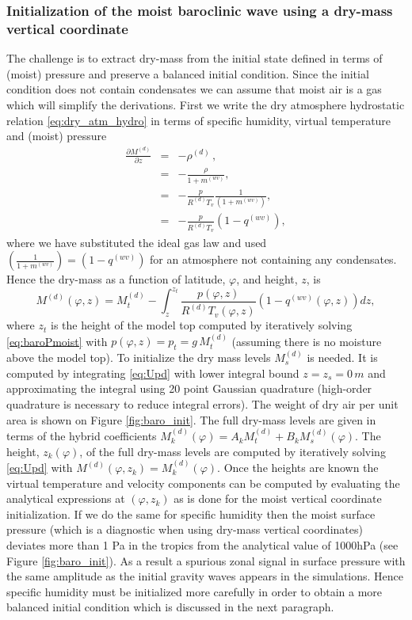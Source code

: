 \documentclass{agujournal}
\begin{document}
\subsubsection{Initialization of the moist baroclinic wave using a dry-mass vertical coordinate}
The challenge is to extract dry-mass from the initial state defined in terms of (moist) pressure and preserve a balanced initial condition. Since the initial condition does not contain condensates we can assume that moist air is a gas which will simplify the derivations. First we write the dry atmosphere hydrostatic relation \eqref{eq:dry_atm_hydro} in terms of specific humidity, virtual temperature and (moist) pressure
\begin{eqnarray}
\frac{\partial M^{(d)}}{\partial z}&=&-\rho^{(d)}\, ,\\
&=&-\frac{\rho}{1+m^{(wv)}},\\
&=&-\frac{p}{R^{(d)}T_v}\frac{1}{\left( 1+m^{(wv)}\right)},\\
&=&-\frac{p}{R^{(d)}T_v}\left(1-q^{(wv)}\right),
\end{eqnarray}
where we have substituted the ideal gas law and used $\left( \frac{1}{1+m^{(wv)}} \right)=\left( 1-q^{(wv)} \right)$ for an atmosphere not containing any condensates. Hence the dry-mass as a function of latitude, $\varphi$, and height, $z$, is
\begin{equation}
{M}^{(d)}(\varphi,z)=M^{(d)}_t-\int_z^{z_t}\frac{p(\varphi,z)}{R^{(d)} T_v(\varphi,z)}\left(1-q^{(wv)}(\varphi,z)\right) dz,\label{eq:Upd}
\end{equation}
where $z_t$ is the height of the model top computed by iteratively solving \eqref{eq:baroPmoist} with $p(\varphi,z)=p_t=g\, M^{(d)}_t$ (assuming there is no moisture above the model top). To initialize the dry mass levels $M^{(d)}_s$ is needed. It is computed by integrating \eqref{eq:Upd} with lower integral bound $z=z_s=0\, m$ and approximating the integral using 20 point Gaussian quadrature (high-order quadrature is necessary to reduce integral errors). The weight of dry air per unit area is shown on Figure \ref{fig:baro_init}. The full dry-mass levels are given in terms of the hybrid coefficients ${M_k^{(d)}}(\varphi)=A_k M^{(d)}_t+B_k {M_s^{(d)}}(\varphi)$. The height, $z_{k}(\varphi)$, of the full dry-mass levels are computed by iteratively solving \eqref{eq:Upd} with ${M}^{(d)}(\varphi,z_k)={M}_{k}^{(d)}(\varphi)$. Once the heights are known the virtual temperature and velocity components can be computed by evaluating the analytical expressions at $(\varphi,z_k)$ as is done for the moist vertical coordinate initialization. If we do the same for specific humidity then the moist surface pressure (which is a diagnostic when using dry-mass vertical coordinates) deviates more than 1 Pa in the tropics from the analytical value of 1000hPa  (see Figure \ref{fig:baro_init}). As a result a spurious zonal signal in surface pressure with the same amplitude as the initial gravity waves appears in the simulations. Hence specific humidity must be initialized more carefully in order to obtain a more balanced initial condition which is discussed in the next paragraph. 
\end{document}
